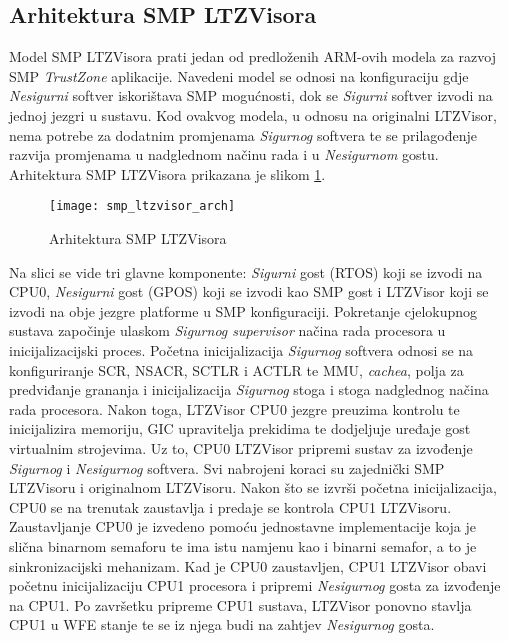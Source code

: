 \documentclass[times, utf8, diplomski, numeric]{fer}
\begin{document}
\subsection{Arhitektura SMP LTZVisora}
Model SMP LTZVisora prati jedan od predloženih ARM-ovih modela za razvoj SMP \textit{TrustZone} aplikacije. Navedeni model se
odnosi na konfiguraciju gdje \textit{Nesigurni} softver iskorištava SMP mogućnosti, dok se \textit{Sigurni} softver izvodi na
jednoj jezgri u sustavu. Kod ovakvog modela, u odnosu na originalni LTZVisor, nema potrebe za dodatnim promjenama
\textit{Sigurnog} softvera te se prilagođenje razvija promjenama u nadglednom načinu rada i u \textit{Nesigurnom} gostu.
Arhitektura SMP LTZVisora prikazana je slikom \ref{smp_ltzvisor}.
\begin{figure}[H]
  \centering
  \texttt{[image: smp\_ltzvisor\_arch]}
  \caption{Arhitektura SMP LTZVisora}
  \label{smp_ltzvisor}
\end{figure}
Na slici se vide tri glavne komponente: \textit{Sigurni} gost (RTOS) koji se izvodi na CPU0, \textit{Nesigurni} gost (GPOS)
koji se izvodi kao SMP gost i LTZVisor koji se izvodi na obje jezgre platforme u SMP konfiguraciji.
Pokretanje cjelokupnog sustava započinje ulaskom \textit{Sigurnog supervisor} načina rada procesora u inicijalizacijski proces.
Početna inicijalizacija \textit{Sigurnog} softvera odnosi se na konfiguriranje SCR, NSACR, SCTLR i ACTLR te MMU,
\textit{cachea}, polja za predviđanje grananja i inicijalizacija \textit{Sigurnog} stoga i stoga nadglednog načina rada
procesora. Nakon toga, LTZVisor CPU0 jezgre preuzima kontrolu te inicijalizira memoriju, GIC upravitelja prekidima te
dodjeljuje uređaje gost virtualnim strojevima. Uz to, CPU0 LTZVisor pripremi sustav za izvođenje \textit{Sigurnog} i
\textit{Nesigurnog} softvera. Svi nabrojeni koraci su zajednički SMP LTZVisoru i originalnom LTZVisoru. Nakon što se izvrši
početna inicijalizacija, CPU0 se na trenutak zaustavlja i predaje se kontrola CPU1 LTZVisoru. Zaustavljanje CPU0 je izvedeno
pomoću jednostavne implementacije koja je slična binarnom semaforu te ima istu namjenu kao i binarni semafor, a to je
sinkronizacijski mehanizam. Kad je CPU0 zaustavljen, CPU1 LTZVisor obavi početnu inicijalizaciju CPU1 procesora i pripremi
\textit{Nesigurnog} gosta za izvođenje na CPU1. Po završetku pripreme CPU1 sustava, LTZVisor ponovno stavlja CPU1 u WFE stanje
te se iz njega budi na zahtjev \textit{Nesigurnog} gosta.
\end{document}
